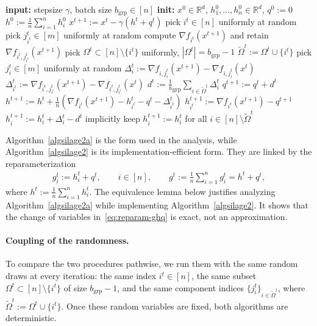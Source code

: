 \documentclass{article}
\newcommand{\bb}{\mathbb}
\newcommand{\R}{\bb R}
\newcommand{\eqdef}{:=}
\newcommand{\rb}[1]{\left(#1\right)}
\theoremstyle{plain}
\newcommand{\algname}[1]{{\sf\scalefont{0.88}\color{mydarkgreen}#1}\xspace}
\def\algname#1{#1}%
\begin{document}
\begin{algorithm}[t]
\small
\caption{\algname{SILAGE} (\textbf{new}), case $n>m$, implementation-efficient form}
\label{algsilage2}
\begin{algorithmic}[1]
    \STATE \textbf{input:} stepsize $\gamma$, batch size $b_{\mathrm{grp}}\in[n]$
    \STATE \textbf{init:} $x^0\in\R^d$, $h_1^0,\ldots,h_n^0\in\R^d$, $q^0\eqdef 0$
    \STATE $h^0\eqdef \frac1n\sum_{i=1}^n h_i^0$
        \STATE $x^{t+1}\eqdef x^t-\gamma\rb{h^t+q^t}$
        \STATE pick $i^t\in[n]$ uniformly at random
        \STATE pick $j_{i^t}^t\in[m]$ uniformly at random
        \STATE compute $\nabla f_{i^t}(x^{t+1})$ and retain $\nabla f_{i^t,j_{i^t}^t}(x^{t+1})$
        \STATE pick $\Omega^t\subset[n]\setminus\{i^t\}$ uniformly, $|\Omega^t|=b_{\mathrm{grp}}-1$
        \STATE $\tilde{\Omega}^t\eqdef \Omega^t\cup\{i^t\}$
            \STATE pick $j_i^t\in[m]$ uniformly at random
            \STATE $\Delta_i^t\eqdef \nabla f_{i,j_i^t}(x^{t+1})-\nabla f_{i,j_i^t}(x^t)$
        \ENDFOR
        \STATE $\Delta_{i^t}^t\eqdef \nabla f_{i^t,j_{i^t}^t}(x^{t+1})-\nabla f_{i^t,j_{i^t}^t}(x^t)$
        \STATE $d^t\eqdef \frac1b_{\mathrm{grp}}\sum_{i\in\tilde{\Omega}^t}\Delta_i^t$
        \STATE $q^{t+1}\eqdef q^t+d^t$
        \STATE $h^{t+1}\eqdef h^t+\frac1n\rb{\nabla f_{i^t}(x^{t+1})-h_{i^t}^t-q^t-\Delta_{i^t}^t}$
        \STATE $h_{i^t}^{t+1}\eqdef \nabla f_{i^t}(x^{t+1})-q^{t+1}$
            \STATE $h_i^{t+1}\eqdef h_i^t+\Delta_i^t-d^t$
        \ENDFOR
        \STATE implicitly keep $h_i^{t+1}\eqdef h_i^t$ for all $i\in[n]\setminus\tilde{\Omega}^t$
    \ENDFOR
\end{algorithmic}
\end{algorithm}

Algorithm~\ref{algsilage2a} is the form used in the analysis, while Algorithm~\ref{algsilage2} is its implementation-efficient form.
They are linked by the reparameterization
\begin{align}
\label{eq:reparam-ghq}
g_i^t \eqdef h_i^t+q^t,\qquad i\in[n],
\qquad
g^t\eqdef \frac1n\sum_{i=1}^n g_i^t=h^t+q^t,
\end{align}
where $h^t\eqdef \frac1n\sum_{i=1}^n h_i^t$.
The equivalence lemma below justifies analyzing Algorithm~\ref{algsilage2a} while implementing Algorithm~\ref{algsilage2}.
It shows that the change of variables in~\eqref{eq:reparam-ghq} is exact, not an approximation.

\paragraph*{Coupling of the randomness.}
To compare the two procedures pathwise, we run them with the same random draws at every iteration:
the same index $i^t\in[n]$, the same subset $\Omega^t\subset[n]\setminus\{i^t\}$ of size $b_{\mathrm{grp}}-1$, and the same component indices $\{j_i^t\}_{i\in\tilde{\Omega}^t}$, where $\tilde{\Omega}^t\eqdef \Omega^t\cup\{i^t\}$.
Once these random variables are fixed, both algorithms are deterministic.
\end{document}
